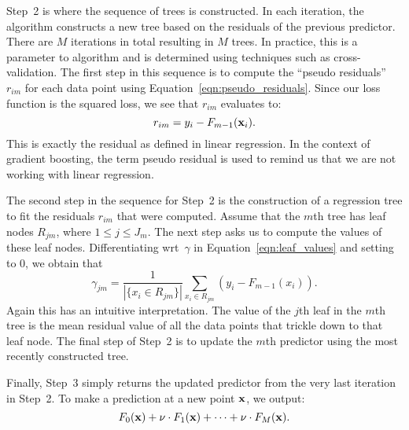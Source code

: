 Step~2 is where the sequence of trees is constructed. In each iteration, 
the algorithm constructs a new tree based on the residuals of the previous 
predictor. There are $M$ iterations in total resulting in $M$ trees. 
In practice, this is a parameter to algorithm and is determined using techniques 
such as cross-validation. The first step in this sequence is to compute the 
``pseudo residuals'' $r_{i m}$ for each data point using 
Equation~\ref{eqn:pseudo_residuals}. Since our loss function 
is the squared loss, we see that $r_{im}$ evaluates to: 
\[
    r_{i m} = y_i - F_{m - 1}(\mathbf{x}_i).
\] 
This is exactly the residual as defined in linear regression. In the context 
of gradient boosting, the term pseudo residual is used to remind us that we 
are not working with linear regression.

The second step in the sequence for Step~2 is the construction of a regression 
tree to fit the residuals $r_{i m}$ that were computed. Assume that the $m$th 
tree has leaf nodes $R_{j m}$, where $1 \leq j \leq J_m$. The next step asks 
us to compute the values of these leaf nodes. Differentiating wrt~$\gamma$ 
in Equation~\ref{eqn:leaf_values} and setting to $0$, we obtain that
\begin{equation}
    \gamma_{j m} 
        = \frac{1}{| \{ x_i \in R_{j m} \} |} \sum_{x_i \in R_{j m}} (y_i - F_{m - 1}(x_i)).
\end{equation}
Again this has an intuitive interpretation. The value of the $j$th leaf in the 
$m$th tree is the mean residual value of all the data points that trickle down
to that leaf node. The final step of Step~2 is to update the $m$th predictor 
using the most recently constructed tree.  

Finally, Step~3 simply returns the updated predictor from the very last iteration
in Step~2. To make a prediction at a new point $\mathbf{x}$, we output:
\[
    F_0(\mathbf{x}) + \nu \cdot F_1(\mathbf{x}) + \cdots + \nu \cdot F_M(\mathbf{x}).
\]

